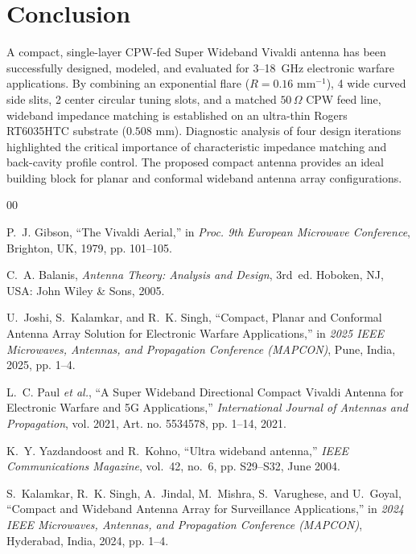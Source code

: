 \documentclass[journal,compsoc,twocolumn,10pt]{IEEEtran}
\begin{document}
\section{Conclusion}
A compact, single-layer CPW-fed Super Wideband Vivaldi antenna has been successfully designed, modeled, and evaluated for 3--18~GHz electronic warfare applications. By combining an exponential flare ($R = 0.16\text{ mm}^{-1}$), 4 wide curved side slits, 2 center circular tuning slots, and a matched $50\,\Omega$ CPW feed line, wideband impedance matching is established on an ultra-thin Rogers RT6035HTC substrate ($0.508\text{ mm}$). Diagnostic analysis of four design iterations highlighted the critical importance of characteristic impedance matching and back-cavity profile control. The proposed compact antenna provides an ideal building block for planar and conformal wideband antenna array configurations.

\begin{thebibliography}{00}

P.~J. Gibson, ``The Vivaldi Aerial,'' in \emph{Proc. 9th European Microwave Conference}, Brighton, UK, 1979, pp. 101--105.

C.~A. Balanis, \emph{Antenna Theory: Analysis and Design}, 3rd~ed. Hoboken, NJ, USA: John Wiley \& Sons, 2005.

U.~Joshi, S.~Kalamkar, and R.~K. Singh, ``Compact, Planar and Conformal Antenna Array Solution for Electronic Warfare Applications,'' in \emph{2025 IEEE Microwaves, Antennas, and Propagation Conference (MAPCON)}, Pune, India, 2025, pp. 1--4.

L.~C. Paul \emph{et al.}, ``A Super Wideband Directional Compact Vivaldi Antenna for Electronic Warfare and 5G Applications,'' \emph{International Journal of Antennas and Propagation}, vol. 2021, Art. no. 5534578, pp. 1--14, 2021.

K.~Y. Yazdandoost and R.~Kohno, ``Ultra wideband antenna,'' \emph{IEEE Communications Magazine}, vol.~42, no.~6, pp. S29--S32, June 2004.

S.~Kalamkar, R.~K. Singh, A.~Jindal, M.~Mishra, S.~Varughese, and U.~Goyal, ``Compact and Wideband Antenna Array for Surveillance Applications,'' in \emph{2024 IEEE Microwaves, Antennas, and Propagation Conference (MAPCON)}, Hyderabad, India, 2024, pp. 1--4.

\end{thebibliography}
\end{document}
